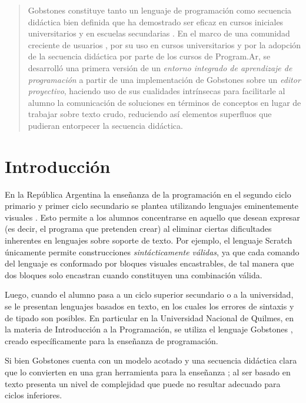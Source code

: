 \begin{abstract}
Gobstones constituye tanto un lenguaje de programación como secuencia didáctica bien definida que ha demostrado ser eficaz en cursos iniciales universitarios y en escuelas secundarias \cite{CuadernoDocenteProgramAR}. En el marco de una comunidad creciente de usuarios \cite{CuadernoDocenteProgramAR}, por su uso en cursos universitarios y por la adopción de la secuencia didáctica por parte de los cursos de Program.Ar, se desarrolló una primera versión de un \emph{entorno integrado de aprendizaje de programación} a partir de una implementación de Gobstones sobre un \emph{editor proyectivo}, haciendo uso de sus cualidades intrínsecas para facilitarle al alumno la comunicación de soluciones en términos de conceptos en lugar de trabajar sobre texto crudo, reduciendo así elementos superfluos que pudieran entorpecer la secuencia didáctica.
\end{abstract}



\section{Introducción} \label{intro}

En la República Argentina la enseñanza de la programación en el segundo ciclo primario y primer ciclo secundario se plantea utilizando lenguajes eminentemente visuales \cite{CuadernoDocenteProgramAR}. Esto permite a los alumnos concentrarse en aquello que desean expresar (es decir, el programa que pretenden crear) al eliminar ciertas dificultades inherentes en lenguajes sobre soporte de texto. Por ejemplo, el lenguaje Scratch \cite{Maloney_scratch} únicamente permite construcciones \textit{sintácticamente válidas}, ya que cada comando del lenguaje es conformado por bloques visuales encastrables, de tal manera que dos bloques solo encastran cuando constituyen una combinación válida.

Luego, cuando el alumno pasa a un ciclo superior secundario o a la universidad, se le presentan lenguajes basados en texto, en los cuales los errores de sintaxis y de tipado son posibles. En particular en la Universidad Nacional de Quilmes, en la materia de Introducción a la Programación, se utiliza el lenguaje Gobstones \cite{Gobstones}, creado específicamente para la enseñanza de programación.

Si bien Gobstones cuenta con un modelo acotado y una secuencia didáctica clara que lo convierten en una gran herramienta para la enseñanza ; al ser basado en texto presenta un nivel de complejidad que puede no resultar adecuado para ciclos inferiores.

